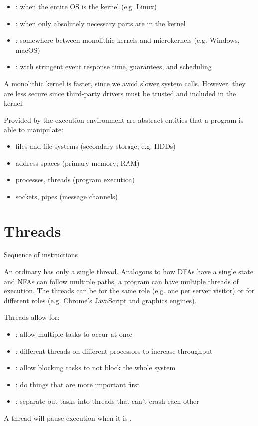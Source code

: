 \begin{defn*}
  \begin{itemize}[nosep]
    \item {}:
          when the entire OS is the kernel (e.g. Linux)
    \item {}:
          when only absolutely necessary parts are in the kernel
    \item {}:
          somewhere between monolithic kernels and microkernels (e.g. Windows, macOS)
    \item {}:
          with stringent event response time, guarantees, and scheduling
  \end{itemize}
\end{defn*}

A monolithic kernel is faster, since we avoid slower system calls.
However, they are less secure since third-party drivers must be trusted and included in the kernel.

Provided by the execution environment are abstract entities
that a program is able to manipulate:
\begin{itemize}[nosep]
  \item files and file systems (secondary storage; e.g. HDDs)
  \item address spaces (primary memory; RAM)
  \item processes, threads (program execution)
  \item sockets, pipes (message channels)
\end{itemize}

\chapter{Threads}

\begin{defn}[thread]
  Sequence of instructions
\end{defn}

An ordinary  has only a single thread.
Analogous to how DFAs have a single state and NFAs can follow multiple paths,
a program can have multiple threads of execution.
The threads can be for the same role (e.g. one per server visitor)
or for different roles (e.g. Chrome's JavaScript and graphics engines).

Threads allow for:
\begin{itemize}[nosep]
  \item {}: allow multiple tasks to occur at once
  \item {}: different threads on different processors to increase throughput
  \item {}: allow blocking tasks to not block the whole system
  \item {}: do things that are more important first
  \item {}: separate out tasks into threads that can't crash each other
\end{itemize}
A thread will pause execution when it is .

